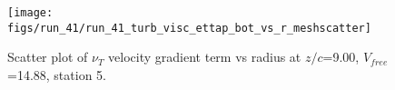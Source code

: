 \begin{figure}[H]
\centering
\texttt{[image: figs/run\_41/run\_41\_turb\_visc\_ettap\_bot\_vs\_r\_meshscatter]}
\caption{Scatter plot of $\nu_T$ velocity gradient term vs radius at $z/c$=9.00, $V_{free}$=14.88, station 5.}
\label{fig:run_41_turb_visc_ettap_bot_vs_r_meshscatter}
\end{figure}


